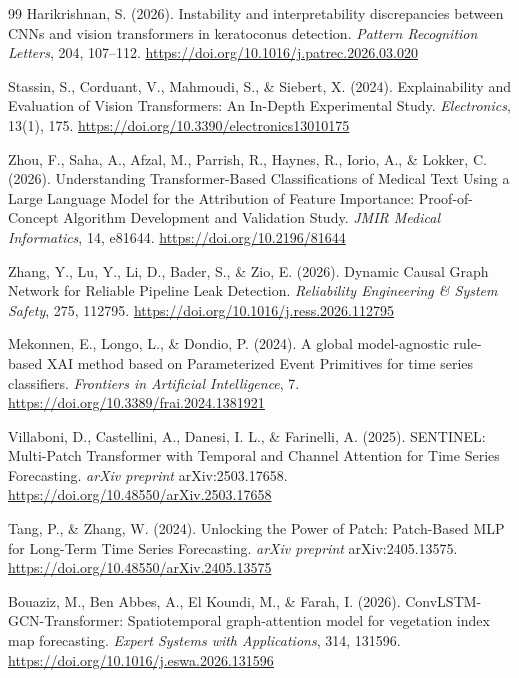 \begin{thebibliography}{99}
 Harikrishnan, S. (2026). Instability and interpretability discrepancies between CNNs and vision transformers in keratoconus detection. \emph{Pattern Recognition Letters}, 204, 107--112. \url{https://doi.org/10.1016/j.patrec.2026.03.020}

 Stassin, S., Corduant, V., Mahmoudi, S., \& Siebert, X. (2024). Explainability and Evaluation of Vision Transformers: An In-Depth Experimental Study. \emph{Electronics}, 13(1), 175. \url{https://doi.org/10.3390/electronics13010175}

 Zhou, F., Saha, A., Afzal, M., Parrish, R., Haynes, R., Iorio, A., \& Lokker, C. (2026). Understanding Transformer-Based Classifications of Medical Text Using a Large Language Model for the Attribution of Feature Importance: Proof-of-Concept Algorithm Development and Validation Study. \emph{JMIR Medical Informatics}, 14, e81644. \url{https://doi.org/10.2196/81644}

 Zhang, Y., Lu, Y., Li, D., Bader, S., \& Zio, E. (2026). Dynamic Causal Graph Network for Reliable Pipeline Leak Detection. \emph{Reliability Engineering \& System Safety}, 275, 112795. \url{https://doi.org/10.1016/j.ress.2026.112795}

 Mekonnen, E., Longo, L., \& Dondio, P. (2024). A global model-agnostic rule-based XAI method based on Parameterized Event Primitives for time series classifiers. \emph{Frontiers in Artificial Intelligence}, 7. \url{https://doi.org/10.3389/frai.2024.1381921}

 Villaboni, D., Castellini, A., Danesi, I. L., \& Farinelli, A. (2025). SENTINEL: Multi-Patch Transformer with Temporal and Channel Attention for Time Series Forecasting. \emph{arXiv preprint} arXiv:2503.17658. \url{https://doi.org/10.48550/arXiv.2503.17658}

 Tang, P., \& Zhang, W. (2024). Unlocking the Power of Patch: Patch-Based MLP for Long-Term Time Series Forecasting. \emph{arXiv preprint} arXiv:2405.13575. \url{https://doi.org/10.48550/arXiv.2405.13575}

 Bouaziz, M., Ben Abbes, A., El Koundi, M., \& Farah, I. (2026). ConvLSTM-GCN-Transformer: Spatiotemporal graph-attention model for vegetation index map forecasting. \emph{Expert Systems with Applications}, 314, 131596. \url{https://doi.org/10.1016/j.eswa.2026.131596}


\end{thebibliography}

